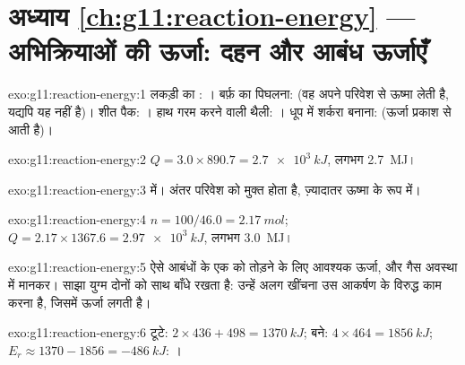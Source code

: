 \section*{अध्याय \ref{ch:g11:reaction-energy} --- अभिक्रियाओं की ऊर्जा: दहन और आबंध ऊर्जाएँ}

\begin{solution}{exo:g11:reaction-energy:1}
लकड़ी का : । बर्फ़ का पिघलना:  (वह अपने परिवेश से ऊष्मा
लेती है, यद्यपि यह  नहीं है)। शीत पैक:
। हाथ गरम करने वाली थैली: । धूप में शर्करा बनाना:
 (ऊर्जा प्रकाश से आती है)।
\end{solution}

\begin{solution}{exo:g11:reaction-energy:2}
$Q = 3.0 \times 890.7 = \qty{2.7e3}{kJ}$, लगभग \qty{2.7}{MJ}।
\end{solution}

\begin{solution}{exo:g11:reaction-energy:3}
 में। अंतर परिवेश को मुक्त होता है, ज़्यादातर
ऊष्मा के रूप में।
\end{solution}

\begin{solution}{exo:g11:reaction-energy:4}
$n = 100 / 46.0 = \qty{2.17}{mol}$; $Q = 2.17 \times 1367.6 =
\qty{2.97e3}{kJ}$, लगभग \qty{3.0}{MJ}।
\end{solution}

\begin{solution}{exo:g11:reaction-energy:5}
ऐसे आबंधों के एक  को तोड़ने के लिए आवश्यक ऊर्जा,  और 
गैस अवस्था में मानकर। साझा युग्म दोनों  को साथ बाँधे रखता है: उन्हें
अलग खींचना उस आकर्षण के विरुद्ध काम करना है, जिसमें ऊर्जा लगती है।
\end{solution}

\begin{solution}{exo:g11:reaction-energy:6}
टूटे: $2 \times 436 + 498 = \qty{1370}{kJ}$; बने:
$4 \times 464 = \qty{1856}{kJ}$; $E_r \approx 1370 - 1856 =
\qty{-486}{kJ}$: ।
\end{solution}

